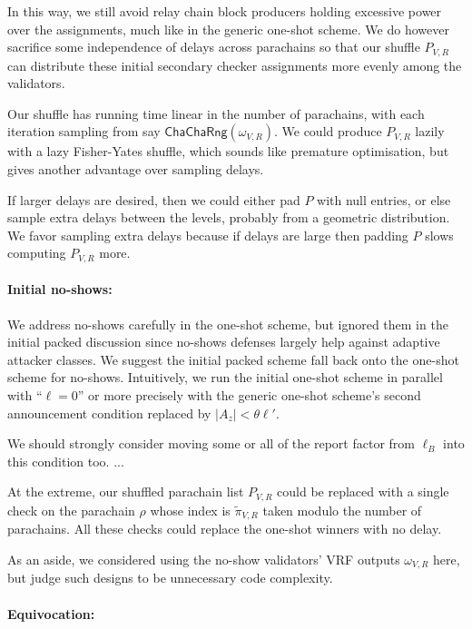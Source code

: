 \begin{enumerate}
\begin{enumerate}

In this way, we still avoid relay chain block producers holding excessive power over the assignments, much like in the generic one-shot scheme.  We do however sacrifice some independence of delays across parachains so that our shuffle $P_{V,R}$ can distribute these initial secondary checker assignments more evenly among the validators.  

Our shuffle has running time linear in the number of parachains, with each iteration sampling from say $\mathsf{ChaChaRng}(\omega_{V,R})$.  We could produce $P_{V,R}$ lazily with a lazy Fisher-Yates shuffle, which sounds like premature optimisation, but gives another advantage over sampling delays.

If larger delays are desired, then we could either pad $P$ with null entries, or else sample extra delays between the levels, probably from a geometric distribution.  We favor sampling extra delays because if delays are large then padding $P$ slows computing $P_{V,R}$ more.

\smallskip
\paragraph{Initial no-shows:}

We address no-shows carefully in the one-shot scheme, but ignored them in the initial packed discussion since no-shows defenses largely help against adaptive attacker classes.  We suggest the initial packed scheme fall back onto the one-shot scheme for no-shows.  Intuitively, we run the initial one-shot scheme in parallel with ``$\ell = 0$'' or more precisely with the generic one-shot scheme's second announcement condition replaced by $|A_z| < \theta \ell'$. 

We should strongly consider moving some or all of the report factor from $\ell_B$ into this condition too.  ...

At the extreme, our shuffled parachain list $P_{V,R}$ could be replaced with a single check on the parachain $\rho$ whose index is $\tilde{\pi}_{V,R}$ taken modulo the number of parachains.  All these checks could replace the one-shot winners with no delay.

As an aside, we considered using the no-show validators' VRF outputs $\omega_{V,R}$ here, but judge such designs to be unnecessary code complexity. 

\smallskip
\paragraph{Equivocation:}


\end{enumerate}
\end{enumerate}
